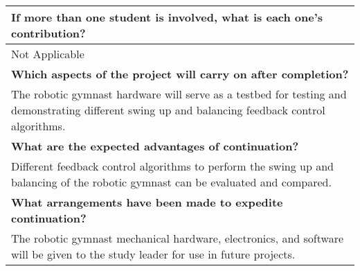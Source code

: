 \begin{titlingpage}
\begin{table}[!h]
\begin{tabular}{|P{15cm}|}
		\hline 
		\textbf{If more than one student is involved, what is each one's contribution?} \\
		\hline 
		Not Applicable \\
		\hline 
		\textbf{Which aspects of the project will carry on after completion?} \\
		\hline
		The robotic gymnast hardware will serve as a testbed for testing and demonstrating different swing up and balancing feedback control algorithms. \\
		\hline 
		\textbf{What are the expected advantages of continuation?} \\
		\hline 
		 Different feedback control algorithms to perform the swing up and balancing of the robotic gymnast can be evaluated and compared. \\
		\hline 
		\textbf{What arrangements have been made to expedite continuation?} \\
		\hline 
		The robotic gymnast mechanical hardware, electronics, and software will be given to the study leader for use in future projects. \\
		\hline
		
		
		
		
		
	\end{tabular}
\end{table}
\end{titlingpage}